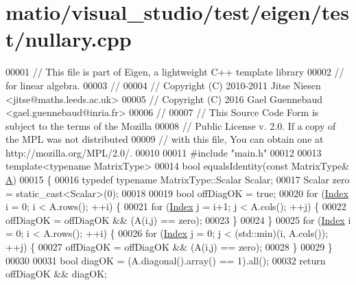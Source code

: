 \hypertarget{matio_2visual__studio_2test_2eigen_2test_2nullary_8cpp_source}{}\section{matio/visual\+\_\+studio/test/eigen/test/nullary.cpp}
\label{matio_2visual__studio_2test_2eigen_2test_2nullary_8cpp_source}

\begin{DoxyCode}
00001 \textcolor{comment}{// This file is part of Eigen, a lightweight C++ template library}
00002 \textcolor{comment}{// for linear algebra.}
00003 \textcolor{comment}{//}
00004 \textcolor{comment}{// Copyright (C) 2010-2011 Jitse Niesen <jitse@maths.leeds.ac.uk>}
00005 \textcolor{comment}{// Copyright (C) 2016 Gael Guennebaud <gael.guennebaud@inria.fr>}
00006 \textcolor{comment}{//}
00007 \textcolor{comment}{// This Source Code Form is subject to the terms of the Mozilla}
00008 \textcolor{comment}{// Public License v. 2.0. If a copy of the MPL was not distributed}
00009 \textcolor{comment}{// with this file, You can obtain one at http://mozilla.org/MPL/2.0/.}
00010 
00011 \textcolor{preprocessor}{#include "main.h"}
00012 
00013 \textcolor{keyword}{template}<\textcolor{keyword}{typename} MatrixType>
00014 \textcolor{keywordtype}{bool} equalsIdentity(\textcolor{keyword}{const} MatrixType& \hyperlink{group___core___module_class_eigen_1_1_matrix}{A})
00015 \{
00016   \textcolor{keyword}{typedef} \textcolor{keyword}{typename} MatrixType::Scalar Scalar;
00017   Scalar zero = \textcolor{keyword}{static\_cast<}Scalar\textcolor{keyword}{>}(0);
00018 
00019   \textcolor{keywordtype}{bool} offDiagOK = \textcolor{keyword}{true};
00020   \textcolor{keywordflow}{for} (\hyperlink{namespace_eigen_a62e77e0933482dafde8fe197d9a2cfde}{Index} i = 0; i < A.rows(); ++i) \{
00021     \textcolor{keywordflow}{for} (\hyperlink{namespace_eigen_a62e77e0933482dafde8fe197d9a2cfde}{Index} j = i+1; j < A.cols(); ++j) \{
00022       offDiagOK = offDiagOK && (A(i,j) == zero);
00023     \}
00024   \}
00025   \textcolor{keywordflow}{for} (\hyperlink{namespace_eigen_a62e77e0933482dafde8fe197d9a2cfde}{Index} i = 0; i < A.rows(); ++i) \{
00026     \textcolor{keywordflow}{for} (\hyperlink{namespace_eigen_a62e77e0933482dafde8fe197d9a2cfde}{Index} j = 0; j < (std::min)(i, A.cols()); ++j) \{
00027       offDiagOK = offDiagOK && (A(i,j) == zero);
00028     \}
00029   \}
00030 
00031   \textcolor{keywordtype}{bool} diagOK = (A.diagonal().array() == 1).all();
00032   \textcolor{keywordflow}{return} offDiagOK && diagOK;

\end{DoxyCode}
